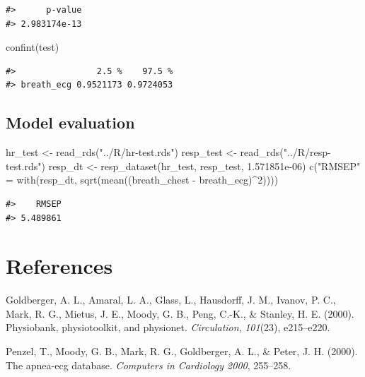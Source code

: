 \documentclass[
]{article}
\newenvironment{Shaded}{\begin{snugshade}}{\end{snugshade}}
\newcommand{\DecValTok}[1]{\textcolor[rgb]{0.00,0.00,0.81}{#1}}
\newcommand{\FloatTok}[1]{\textcolor[rgb]{0.00,0.00,0.81}{#1}}
\newcommand{\FunctionTok}[1]{\textcolor[rgb]{0.00,0.00,0.00}{#1}}
\newcommand{\NormalTok}[1]{#1}
\newcommand{\OtherTok}[1]{\textcolor[rgb]{0.56,0.35,0.01}{#1}}
\newcommand{\SpecialCharTok}[1]{\textcolor[rgb]{0.00,0.00,0.00}{#1}}
\newcommand{\StringTok}[1]{\textcolor[rgb]{0.31,0.60,0.02}{#1}}
\newlength{\cslhangindent}
\newlength{\cslentryspacingunit} %
\newenvironment{CSLReferences}[2] %
 {%
  \setlength{\parindent}{0pt}
  \ifodd #1
  \let\oldpar\par
  \def\par{\hangindent=\cslhangindent\oldpar}
  \fi
  \setlength{\parskip}{#2\cslentryspacingunit}
 }%
 {}
\begin{document}
\begin{verbatim}
#>      p-value 
#> 2.983174e-13
\end{verbatim}

\begin{Shaded}
\begin{Highlighting}[]
\FunctionTok{confint}\NormalTok{(test)}
\end{Highlighting}
\end{Shaded}

\begin{verbatim}
#>                2.5 %    97.5 %
#> breath_ecg 0.9521173 0.9724053
\end{verbatim}

\hypertarget{model-evaluation}{%
\subsection{Model evaluation}\label{model-evaluation}}

\begin{Shaded}
\begin{Highlighting}[]
\NormalTok{hr\_test }\OtherTok{\textless{}{-}} \FunctionTok{read\_rds}\NormalTok{(}\StringTok{"../R/hr{-}test.rds"}\NormalTok{)}
\NormalTok{resp\_test }\OtherTok{\textless{}{-}} \FunctionTok{read\_rds}\NormalTok{(}\StringTok{"../R/resp{-}test.rds"}\NormalTok{)}
\NormalTok{resp\_dt }\OtherTok{\textless{}{-}} \FunctionTok{resp\_dataset}\NormalTok{(hr\_test, resp\_test, }\FloatTok{1.571851e{-}06}\NormalTok{)}
\FunctionTok{c}\NormalTok{(}\StringTok{"RMSEP"} \OtherTok{=} \FunctionTok{with}\NormalTok{(resp\_dt, }\FunctionTok{sqrt}\NormalTok{(}\FunctionTok{mean}\NormalTok{((breath\_chest }\SpecialCharTok{{-}}\NormalTok{ breath\_ecg)}\SpecialCharTok{\^{}}\DecValTok{2}\NormalTok{))))}
\end{Highlighting}
\end{Shaded}

\begin{verbatim}
#>    RMSEP 
#> 5.489861
\end{verbatim}

\newpage

\hypertarget{references}{%
\section*{References}\label{references}}

\hypertarget{refs}{}
\begin{CSLReferences}{1}{1}
\leavevmode{}%
Goldberger, A. L., Amaral, L. A., Glass, L., Hausdorff, J. M., Ivanov,
P. C., Mark, R. G., Mietus, J. E., Moody, G. B., Peng, C.-K., \&
Stanley, H. E. (2000). Physiobank, physiotoolkit, and physionet.
\emph{Circulation}, \emph{101}(23), e215--e220.

\leavevmode{}%
Penzel, T., Moody, G. B., Mark, R. G., Goldberger, A. L., \& Peter, J.
H. (2000). The apnea-ecg database. \emph{Computers in Cardiology 2000},
255--258.

\end{CSLReferences}
\end{document}
